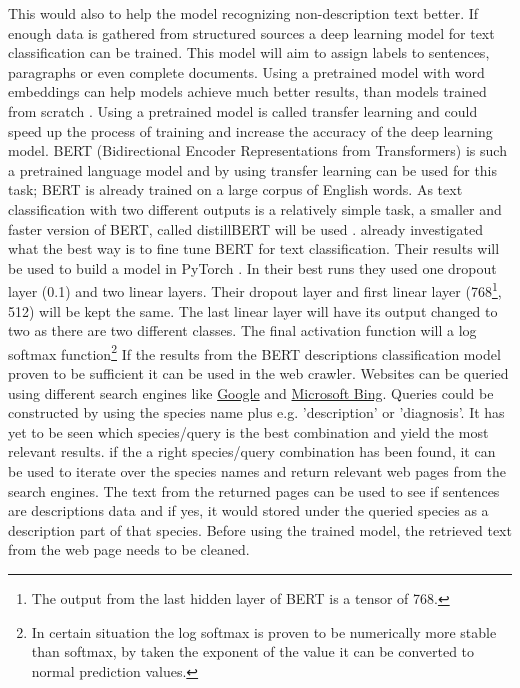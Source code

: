 \documentclass{article}
\begin{document}
This would also to help the model recognizing non-description text better.
If enough data is gathered from structured sources a deep learning model for text classification can be trained.
This model will aim to assign labels to sentences, paragraphs or even complete documents. 
Using a pretrained model with word embeddings can help models achieve much better results, than models trained from scratch \cite{mikolov_distributed_2013}.
Using a pretrained model is called transfer learning and could speed up the process of training and increase the accuracy of the deep learning model.
BERT (Bidirectional Encoder Representations from Transformers) \cite{devlin_bert_2019} is such a pretrained language model and by using transfer learning can be used for this task; BERT is already trained on a large corpus of English words.
As text classification with two different outputs is a relatively simple task, a smaller and faster version of BERT, called distillBERT will be used \cite{sanh_distilbert_2020}.
\cite{sun_how_2020} already investigated what the best way is to fine tune BERT for text classification. 
Their results will be used to build a model in PyTorch \cite{paszke_pytorch_2019}.
In their best runs they used one dropout layer (0.1) and two linear layers. 
Their dropout layer and first linear layer (768\footnote{The output from the last hidden layer of BERT is a tensor of 768.}, 512) will be kept the same.
The last linear layer will have its output changed to two as there are two different classes.
The final activation function will a log softmax function\footnote{In certain situation the log softmax is proven to be numerically more stable than softmax, by taken the exponent of the value it can be converted to normal prediction values.}
If the results from the BERT descriptions classification model proven to be sufficient it can be used in the web crawler.
Websites can be queried using different search engines like \href{www.google.com}{Google} and \href{www.bing.com}{Microsoft Bing}.
Queries could be constructed by using the species name plus e.g. 'description' or 'diagnosis'. 
It has yet to be seen which species/query is the best combination and yield the most relevant results.
if the a right species/query combination has been found, it can be used to iterate over the species names and return relevant web pages from the search engines.
The text from the returned pages can be used to see if sentences are descriptions data and if yes, it would stored under the queried species as a description part of that species.
Before using the trained model, the retrieved text from the web page needs to be cleaned.
\end{document}
